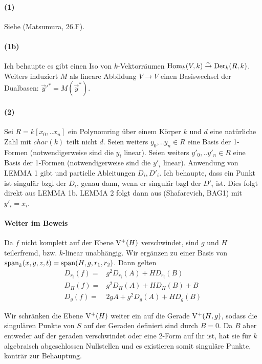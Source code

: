 \paragraph{(1)}
Siehe (Matsumura, 26.F).

\paragraph{(1b)}
Ich behaupte es gibt einen Iso von $k$-Vektorräumen ${\operatorname{Hom}}_k(V,k) \overset\sim\to {\operatorname{Der}}_k(R,k)$.
Weiters induziert $M$ als lineare Abbildung $V \to V$ einen Basiswechsel der Dualbasen: $\vec y'^* = M(\vec y^*)$.

\paragraph{(2)} 
Sei $R = k[x_0,..x_n]$ ein Polynomring über einem Körper $k$ und $d$ eine natürliche Zahl mit $char(k)$ teilt nicht $d$.
Seien weiters $y_0,..y_n \in R$ eine Basis der 1-Formen (notwendigerweise sind die $y_i$ linear).
Seien weiters $y'_0,..y'_n \in R$ eine Basis der 1-Formen (notwendigerweise sind die $y'_i$ linear).
Anwendung von LEMMA 1 gibt und partielle Ableitungen $D_i, D'_i$.
Ich behaupte, dass ein Punkt ist singulär bzgl der $D_i$, genau dann, wenn er singulär bzgl der $D'_i$ ist.
Dies folgt direkt aus LEMMA 1b.
LEMMA 2 folgt dann aus (Shafarevich, BAG1) mit $y'_i = x_i$.


\paragraph{Weiter im Beweis}
Da $f$ nicht komplett auf der Ebene $\operatorname{V^+}(H)$ verschwindet, sind $g$ und $H$ teilerfremd, bzw. $k$-linear unabhängig. Wir ergänzen zu einer Basis von ${\operatorname{span}}_k(x,y,z,t) = {\operatorname{span}}(H,g,r_1,r_2)$.
Dann gelten
\begin{align*}
D_{r_i}(f) =& g^2 D_{r_i}(A)  + H D_{r_i}(B) \\
D_H(f)     =& g^2 D_H(A)      + H D_H(B) + B \\
D_g(f)     =& 2gA + g^2D_g(A) + H D_g(B)
\end{align*}

Wir schränken die Ebene $\operatorname{V^+}(H)$ weiter ein auf die Gerade $\operatorname{V^+}(H,g)$, sodass die singulären Punkte von $S$ auf der Geraden definiert sind durch $B = 0$.
Da $B$ aber entweder auf der geraden verschwindet oder eine 2-Form auf ihr ist, hat sie für $k$ algebraisch abgeschlossen Nullstellen und es existieren somit singuläre Punkte, konträr zur Behauptung.


